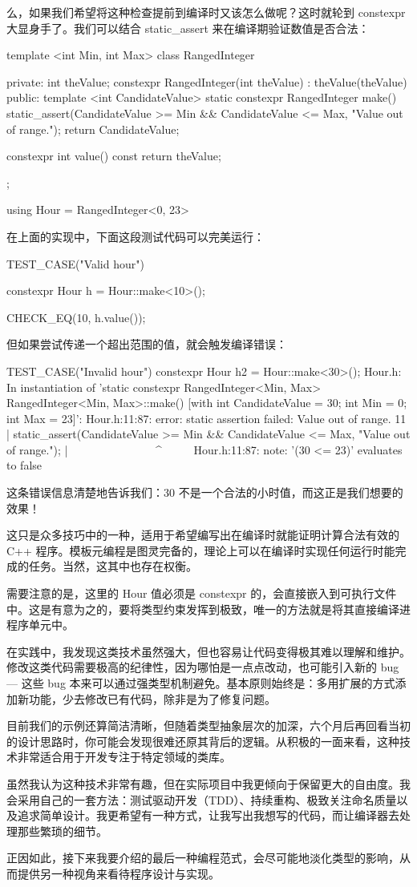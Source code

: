 么，如果我们希望将这种检查提前到编译时又该怎么做呢？这时就轮到 constexpr 大显身手了。我们可以结合 static\_assert 来在编译期验证数值是否合法：

\begin{cpp}
template <int Min, int Max>
class RangedInteger{
private:
  int theValue;
  constexpr RangedInteger(int theValue) : theValue(theValue) {}
public:
  template <int CandidateValue>
  static constexpr RangedInteger make() {
    static_assert(CandidateValue >= Min && CandidateValue <= Max, "Value out of range.");
    return CandidateValue;
  }

  constexpr int value() const {
    return theValue;
  }
};

using Hour = RangedInteger<0, 23>
\end{cpp}

在上面的实现中，下面这段测试代码可以完美运行：

\begin{cpp}
TEST_CASE("Valid hour"){
  constexpr Hour h = Hour::make<10>();

  CHECK_EQ(10, h.value());
}
\end{cpp}

但如果尝试传递一个超出范围的值，就会触发编译错误：

\begin{shell}
TEST_CASE("Invalid hour"){
  constexpr Hour h2 = Hour::make<30>();
}
Hour.h: In instantiation of 'static constexpr RangedInteger<Min, Max>
RangedInteger<Min, Max>::make() [with int CandidateValue = 30; int Min
= 0; int Max = 23]':
Hour.h:11:87: error: static assertion failed: Value out of range.
   11 | static_assert(CandidateValue >= Min && CandidateValue <= Max, "Value out of range.");
      |                                        ~~~~~~~~~~~~~~~^~~~~~
Hour.h:11:87: note: '(30 <= 23)' evaluates to false
\end{shell}

这条错误信息清楚地告诉我们：30 不是一个合法的小时值，而这正是我们想要的效果！

这只是众多技巧中的一种，适用于希望编写出在编译时就能证明计算合法有效的 C++ 程序。模板元编程是图灵完备的，理论上可以在编译时实现任何运行时能完成的任务。当然，这其中也存在权衡。

需要注意的是，这里的 Hour 值必须是 constexpr 的，会直接嵌入到可执行文件中。这是有意为之的，要将类型约束发挥到极致，唯一的方法就是将其直接编译进程序单元中。

在实践中，我发现这类技术虽然强大，但也容易让代码变得极其难以理解和维护。修改这类代码需要极高的纪律性，因为哪怕是一点点改动，也可能引入新的 bug --- 这些 bug 本来可以通过强类型机制避免。基本原则始终是：多用扩展的方式添加新功能，少去修改已有代码，除非是为了修复问题。

目前我们的示例还算简洁清晰，但随着类型抽象层次的加深，六个月后再回看当初的设计思路时，你可能会发现很难还原其背后的逻辑。从积极的一面来看，这种技术非常适合用于开发专注于特定领域的类库。

虽然我认为这种技术非常有趣，但在实际项目中我更倾向于保留更大的自由度。我会采用自己的一套方法：测试驱动开发（TDD）、持续重构、极致关注命名质量以及追求简单设计。我更希望有一种方式，让我写出我想写的代码，而让编译器去处理那些繁琐的细节。

正因如此，接下来我要介绍的最后一种编程范式，会尽可能地淡化类型的影响，从而提供另一种视角来看待程序设计与实现。